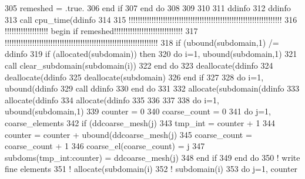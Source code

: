 \begin{DoxyCode}
305           remeshed = .true.
306 \textcolor{keywordflow}{        end if}
307 \textcolor{keywordflow}{      end do}
308 
309 
310 
311       ddinfo%
312       ddinfo%
313       \textcolor{keyword}{call }cpu\_time(ddinfo%
314 
315       \textcolor{comment}{!!!!!!!!!!!!!!!!!!!!!!!!!!!!!!!!!!!!!!!!!!!!!!!!!!!!!!!!!!!!!!!!!!!}
316       \textcolor{comment}{!!!!!!!!!!!!!!!!!!! begin if remeshed!!!!!!!!!!!!!!!!!!!!!!!!!!!!!!}
317       \textcolor{comment}{!!!!!!!!!!!!!!!!!!!!!!!!!!!!!!!!!!!!!!!!!!!!!!!!!!!!!!!!!!!!!!!!!!!}
318       \textcolor{keywordflow}{if} (ubound(subdomain,1) /= ddinfo%
319         \textcolor{keywordflow}{if} (\textcolor{keyword}{allocated}(subdomain)) \textcolor{keywordflow}{then}
320           \textcolor{keywordflow}{do} i=1, ubound(subdomain,1) 
321             \textcolor{keyword}{call }clear\_subdomain(subdomain(i))
322 \textcolor{keywordflow}{          end do}
323           \textcolor{keyword}{deallocate}(ddinfo%
324           \textcolor{keyword}{deallocate}(ddinfo%
325           \textcolor{keyword}{deallocate}(subdomain)
326 \textcolor{keywordflow}{        end if}  
327         
328         \textcolor{keywordflow}{do} i=1, ubound(ddinfo%
329           \textcolor{keyword}{call }ddinfo%
330 \textcolor{keywordflow}{        end do}
331          
332         \textcolor{keyword}{allocate}(subdomain(ddinfo%
333         \textcolor{keyword}{allocate}(ddinfo%
334         \textcolor{keyword}{allocate}(ddinfo%
335        
336 
337 
338         \textcolor{keywordflow}{do} i=1, ubound(subdomain,1)
339           counter = 0
340           coarse\_count = 0
341           \textcolor{keywordflow}{do} j=1, coarse_elements%
342             \textcolor{keywordflow}{if} (ddcoarse_mesh(j)%
343               tmp\_int = counter + 1
344               counter = counter + ubound(ddcoarse_mesh(j)%
345               coarse\_count = coarse\_count + 1
346               coarse\_el(coarse\_count) = j
347               subdoms(tmp\_int:counter) = ddcoarse_mesh(j)%
348 \textcolor{keywordflow}{            end if}
349 \textcolor{keywordflow}{          end do}
350           \textcolor{comment}{! write fine elements}
351 \textcolor{comment}{!         allocate(subdomain(i)%
352 \textcolor{comment}{!         subdomain(i)%
353           \textcolor{keywordflow}{do} j=1, counter
}}
\end{DoxyCode}
